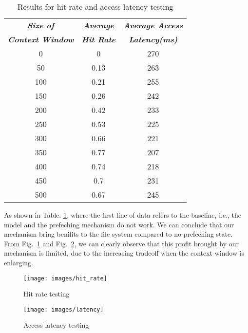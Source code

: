 \documentclass[conference]{IEEEtran}
\begin{document}
\begin{table}[htbp]
    \caption{Results for hit rate and access latency testing} 
\begin{center}
    \begin{tabular}{ |c|c|c| } 
     \hline
     \textbf{\textit{Size of}}&\textbf{\textit{Average}} &\textbf{\textit{Average Access}}\\ 
     \textbf{\textit{Context Window}}& \textbf{\textit{Hit Rate}} & \textbf{\textit{Latency(ms)}}\\
     \hline
     \hline
     0	&0	&270\\
     \hline
     50	&0.13	&263\\
     \hline
     100	&0.21	&255\\
     \hline
     150	&0.26	&242\\
     \hline
     200	&0.42	&233\\
     \hline
     250	&0.53	&225\\
     \hline
     300	&0.66	&221\\
     \hline
     350	&0.77	&207\\
     \hline
     400	&0.74	&218\\
     \hline
     450	&0.7	&231\\
     \hline
     500	&0.67	&245\\
     \hline
    \end{tabular}
\end{center}

    \label{table:result}
\end{table}
As shown in Table. \ref{table:result}, where the first line of data refers to the baseline, i.e., the model and the prefeching mechanism do not work.
We can conclude that our mechanism bring benifits to the file system compared to no-prefeching state.
From Fig.~\ref{fig:hit_rate} and Fig.~\ref{fig:latency}, we can clearly observe that this profit brought by our mechanism is limited, 
due to the increasing tradeoff when the context window is enlarging.
\begin{figure}
\centering
\texttt{[image: images/hit\_rate]}
\caption{Hit rate testing}
\label{fig:hit_rate}
\end{figure}

\begin{figure}
\centering
\texttt{[image: images/latency]}
\caption{Access latency testing}
\label{fig:latency}
\end{figure}
\end{document}
